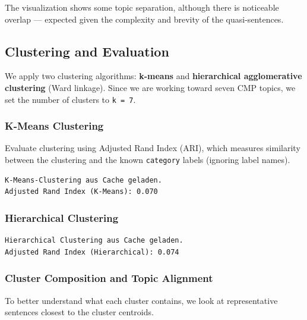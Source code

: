 \documentclass[
  letterpaper,
  DIV=11,
  numbers=noendperiod]{scrartcl}
\begin{document}
The visualization shows some topic separation, although there is
noticeable overlap --- expected given the complexity and brevity of the
quasi-sentences.

\subsection{Clustering and Evaluation}\label{clustering-and-evaluation}

We apply two clustering algorithms: \textbf{k-means} and
\textbf{hierarchical agglomerative clustering} (Ward linkage). Since we
are working toward seven CMP topics, we set the number of clusters to
\texttt{k\ =\ 7}.

\subsubsection{K-Means Clustering}\label{k-means-clustering-1}

Evaluate clustering using Adjusted Rand Index (ARI), which measures
similarity between the clustering and the known \texttt{category} labels
(ignoring label names).

\begin{verbatim}
K-Means-Clustering aus Cache geladen.
Adjusted Rand Index (K-Means): 0.070
\end{verbatim}

\subsubsection{Hierarchical Clustering}\label{hierarchical-clustering}

\begin{verbatim}
Hierarchical Clustering aus Cache geladen.
Adjusted Rand Index (Hierarchical): 0.074
\end{verbatim}

\subsubsection{Cluster Composition and Topic
Alignment}\label{cluster-composition-and-topic-alignment}

To better understand what each cluster contains, we look at
representative sentences closest to the cluster centroids.
\end{document}
